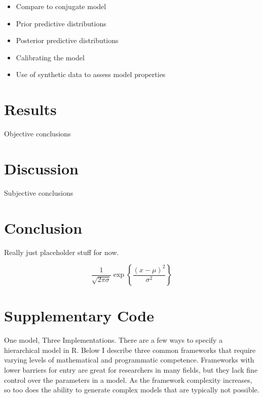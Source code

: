 \documentclass[
]{report}
\providecommand{\tightlist}{%
  \setlength{\itemsep}{0pt}\setlength{\parskip}{0pt}}
\begin{document}
\begin{itemize}
\tightlist
\item
  Compare to conjugate model
\item
  Prior predictive distributions
\item
  Posterior predictive distributions
\item
  Calibrating the model
\item
  Use of synthetic data to assess model properties
\end{itemize}

\hypertarget{results}{%
\chapter{Results}\label{results}}

Objective conclusions

\hypertarget{discussion}{%
\chapter{Discussion}\label{discussion}}

Subjective conclusions

\hypertarget{conclusion}{%
\chapter{Conclusion}\label{conclusion}}

Really just placeholder stuff for now.

\[
\frac{1}{\sqrt{2\pi\sigma}} \exp{\left\lbrace \frac{(x-\mu)^2}{\sigma^2} \right\rbrace}
\]

\hypertarget{appendix-appendix}{%
\appendix {}}


\hypertarget{supplementary-code}{%
\chapter{Supplementary Code}\label{supplementary-code}}

One model, Three Implementations. There are a few ways to specify a hierarchical model in R. Below I describe three common frameworks that require varying levels of mathematical and programmatic competence. Frameworks with lower barriers for entry are great for researchers in many fields, but they lack fine control over the parameters in a model. As the framework complexity increases, so too does the ability to generate complex models that are typically not possible.
\end{document}
